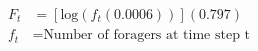 \documentclass[fleqn, oneside, 11pt]{article}%
\begin{document}
\begin{preview}
\begin{align*}%
F_{t} & = [\text{log}(f_{t}(0.0006))](0.797)\nonumber \\
f_{t} & =  \text{Number of foragers at time step t} \nonumber \\
\end{align*} 
\end{preview}
\end{document}

